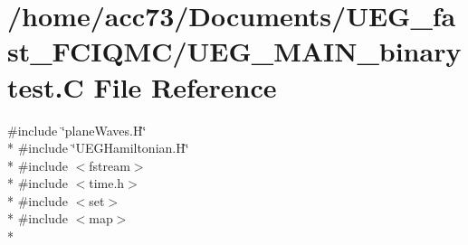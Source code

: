 \hypertarget{UEG__MAIN__binarytest_8C}{\section{/home/acc73/\-Documents/\-U\-E\-G\-\_\-fast\-\_\-\-F\-C\-I\-Q\-M\-C/\-U\-E\-G\-\_\-\-M\-A\-I\-N\-\_\-binarytest.C File Reference}
\label{UEG__MAIN__binarytest_8C}
}
{\ttfamily \#include \char`\"{}plane\-Waves.\-H\char`\"{}}\\*
{\ttfamily \#include \char`\"{}U\-E\-G\-Hamiltonian.\-H\char`\"{}}\\*
{\ttfamily \#include $<$fstream$>$}\\*
{\ttfamily \#include $<$time.\-h$>$}\\*
{\ttfamily \#include $<$set$>$}\\*
{\ttfamily \#include $<$map$>$}\\*
